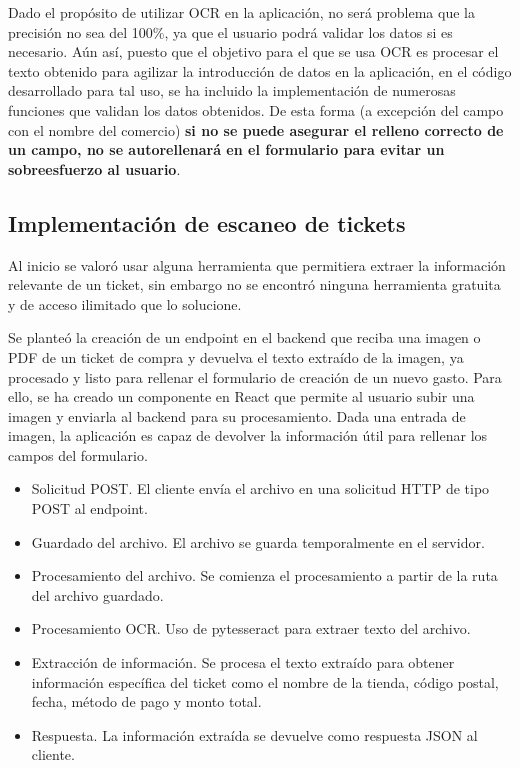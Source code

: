 Dado el propósito de utilizar OCR en la aplicación, no será problema que la precisión no sea del 100\%, ya que el usuario podrá validar los datos si es necesario. Aún así, puesto que el objetivo para el que se usa OCR es procesar el texto obtenido para agilizar la introducción de datos en la aplicación, en el código desarrollado para tal uso, se ha incluido la implementación de numerosas funciones que validan los datos obtenidos. De esta forma (a excepción del campo con el nombre del comercio) \textbf{si no se puede asegurar el relleno correcto de un campo, no se autorellenará en el formulario para evitar un sobreesfuerzo al usuario}.



\subsection{Implementación de escaneo de tickets}
Al inicio se valoró usar alguna herramienta que permitiera extraer la información relevante de un ticket, sin embargo no se encontró ninguna herramienta gratuita y de acceso ilimitado que lo solucione. 

Se planteó la creación de un endpoint en el backend que reciba una imagen o PDF de un ticket de compra y devuelva el texto extraído de la imagen, ya procesado y listo para rellenar el formulario de creación de un nuevo gasto. Para ello, se ha creado un componente en React que permite al usuario subir una imagen y enviarla al backend para su procesamiento. Dada una entrada de imagen, la aplicación es capaz de devolver la información útil para rellenar los campos del formulario.

\begin{itemize}
    \item Solicitud POST. El cliente envía el archivo en una solicitud HTTP de tipo POST al endpoint.
    \item Guardado del archivo. El archivo se guarda temporalmente en el servidor.
    \item Procesamiento del archivo. Se comienza el procesamiento a partir de la ruta del archivo guardado.
    \item Procesamiento OCR. Uso de pytesseract para extraer texto del archivo.
    \item Extracción de información. Se procesa el texto extraído para obtener información específica del ticket como el nombre de la tienda, código postal, fecha, método de pago y monto total.
    \item Respuesta. La información extraída se devuelve como respuesta JSON al cliente.
\end{itemize}

